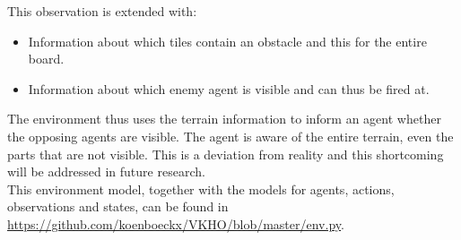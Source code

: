 This observation is extended with:
\begin{itemize}
    \item Information about which tiles contain an obstacle and this for the entire board.
    \item Information about which enemy agent is visible and can thus be fired at. 
\end{itemize}
The environment thus uses the terrain information to inform an agent whether the opposing agents are visible. The agent is aware of the entire terrain, even the parts that are not visible. This is a deviation from reality and this shortcoming will be addressed in future research.\\
This environment model, together with the models for agents, actions, observations and states, can be found in \url{https://github.com/koenboeckx/VKHO/blob/master/env.py}.